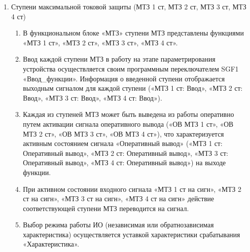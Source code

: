 \begin{enumerate}
\begin{enumerate}
\item
Основные характеристики функционального блока «МТЗ»:
\begin{itemize}
    \item погрешность по углу $\phi_{\textsl{м.ч.}}$ при номинальных значениях тока и напряжения не более 5$^\circ$.
\end{itemize}

\item
Функциональный блок «МТЗ» может быть полностью выведен из работы оперативно путем активации сигнала «ОВ МТЗ».
\item
В таблице \ref{mtz:tbl1} приведены параметры, необходимые для настройки МТЗ.

\end{enumerate}


\item Ступени максимальной токовой защиты (МТЗ 1 ст, МТЗ 2 ст, МТЗ 3 ст, МТЗ 4 ст)

\begin{enumerate}

\item
В функциональном блоке «МТЗ» ступени МТЗ представлены функциями «МТЗ 1 ст», «МТЗ 2 ст», «МТЗ 3 ст», «МТЗ 4 ст».

\item
Ввод каждой ступени МТЗ в работу на этапе параметрирования устройства осуществляется своим программным переключателем SGF1 «Ввод\_функции». Информация о введенной ступени отображается выходным сигналом для каждой ступени («МТЗ 1 ст: Ввод», «МТЗ 2 ст: Ввод», «МТЗ 3 ст: Ввод», «МТЗ 4 ст: Ввод»).

\item
Каждая из ступеней МТЗ может быть выведена из работы оперативно путем активации сигнала оперативного вывода («ОВ МТЗ 1 ст», «ОВ МТЗ 2 ст», «ОВ МТЗ 3 ст», «ОВ МТЗ 4 ст»), что характеризуется активным состоянием сигнала «Оперативный вывод» («МТЗ 1 ст: Оперативный вывод», «МТЗ 2 ст: Оперативный вывод», «МТЗ 3 ст: Оперативный вывод», «МТЗ 4 ст: Оперативный вывод») на выходе функции.

\item
При активном состоянии входного сигнала «МТЗ 1 ст на сигн», «МТЗ 2 ст на сигн», «МТЗ 3 ст на сигн», «МТЗ 4 ст на сигн» действие соответствующей ступени МТЗ переводится на сигнал.

\item
Выбор режима работы ИО (независимая или обратнозависимая характеристика) осуществляется уставкой характеристики срабатывания «Характеристика».


\end{enumerate}
\end{enumerate}
